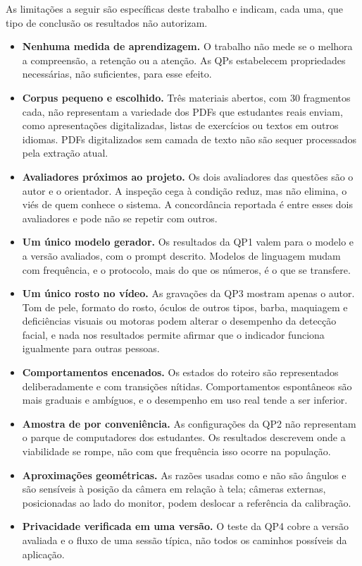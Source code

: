 As limitações a seguir são específicas deste trabalho e indicam, cada uma, que tipo de conclusão os resultados não autorizam.

\begin{itemize}
  \item \textbf{Nenhuma medida de aprendizagem.} O trabalho não mede se o \ferramenta melhora a compreensão, a retenção ou a atenção. As QPs estabelecem propriedades necessárias, não suficientes, para esse efeito.
  \item \textbf{Corpus pequeno e escolhido.} Três materiais abertos, com 30 fragmentos cada, não representam a variedade dos PDFs que estudantes reais enviam, como apresentações digitalizadas, listas de exercícios ou textos em outros idiomas. PDFs digitalizados sem camada de texto não são sequer processados pela extração atual.
  \item \textbf{Avaliadores próximos ao projeto.} Os dois avaliadores das questões são o autor e o orientador. A inspeção cega à condição reduz, mas não elimina, o viés de quem conhece o sistema. A concordância reportada é entre esses dois avaliadores e pode não se repetir com outros.
  \item \textbf{Um único modelo gerador.} Os resultados da QP1 valem para o modelo e a versão avaliados, com o prompt descrito. Modelos de linguagem mudam com frequência, e o protocolo, mais do que os números, é o que se transfere.
  \item \textbf{Um único rosto no vídeo.} As gravações da QP3 mostram apenas o autor. Tom de pele, formato do rosto, óculos de outros tipos, barba, maquiagem e deficiências visuais ou motoras podem alterar o desempenho da detecção facial, e nada nos resultados permite afirmar que o indicador funciona igualmente para outras pessoas.
  \item \textbf{Comportamentos encenados.} Os estados do roteiro são representados deliberadamente e com transições nítidas. Comportamentos espontâneos são mais graduais e ambíguos, e o desempenho em uso real tende a ser inferior.
  \item \textbf{Amostra de  por conveniência.} As configurações da QP2 não representam o parque de computadores dos estudantes. Os resultados descrevem onde a viabilidade se rompe, não com que frequência isso ocorre na população.
  \item \textbf{Aproximações geométricas.} As razões usadas como  e  não são ângulos e são sensíveis à posição da câmera em relação à tela; câmeras externas, posicionadas ao lado do monitor, podem deslocar a referência da calibração.
  \item \textbf{Privacidade verificada em uma versão.} O teste da QP4 cobre a versão avaliada e o fluxo de uma sessão típica, não todos os caminhos possíveis da aplicação.
\end{itemize}

